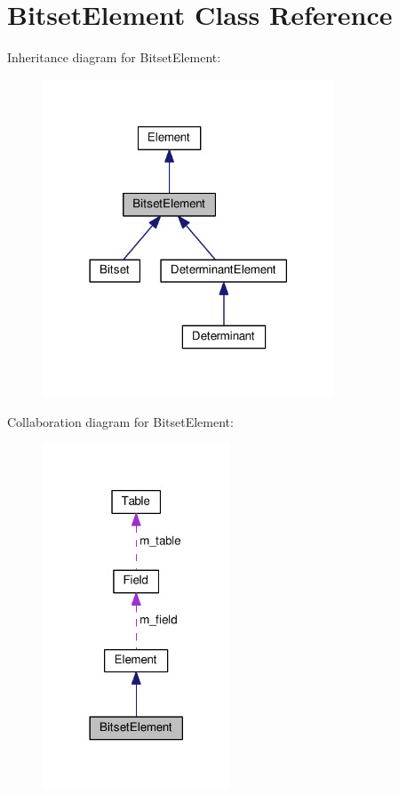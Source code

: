 \hypertarget{classBitsetElement}{}\section{Bitset\+Element Class Reference}
\label{classBitsetElement}


Inheritance diagram for Bitset\+Element\+:
\nopagebreak
\begin{figure}[H]
\begin{center}
\leavevmode
\includegraphics[width=246pt]{classBitsetElement__inherit__graph}
\end{center}
\end{figure}


Collaboration diagram for Bitset\+Element\+:
\nopagebreak
\begin{figure}[H]
\begin{center}
\leavevmode
\includegraphics[width=158pt]{classBitsetElement__coll__graph}
\end{center}
\end{figure}
